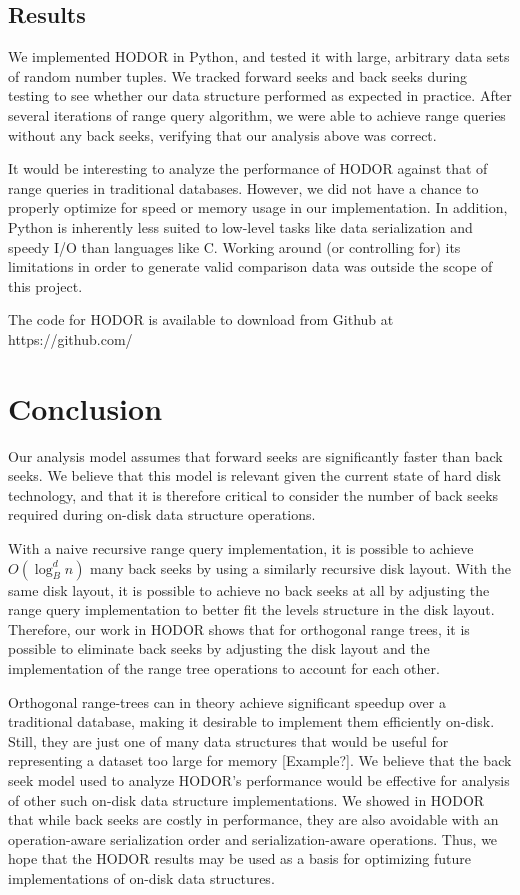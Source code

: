 \documentclass[11pt, oneside]{article}
\begin{document}
\subsection{Results}

We implemented HODOR in Python, and tested it with large, arbitrary data sets of
random number tuples. We tracked forward seeks and back seeks during testing to
see whether our data structure performed as expected in practice. After several 
iterations of range query algorithm, we were able to achieve range queries
without any back seeks, verifying that our analysis above was correct. 

It would be interesting to analyze the performance of HODOR against that of
range queries in traditional databases. However, we did not have a chance to
properly optimize for speed or memory usage in our implementation. In addition,
Python is inherently less suited to low-level tasks like data serialization and
speedy I/O than languages like C. Working around (or controlling for) its
limitations in order to generate valid comparison data was outside the scope of
this project. 

The code for HODOR is available to download from Github at
https://github.com/%

\section{Conclusion}

Our analysis model assumes that forward seeks are significantly faster than
back seeks. We believe that this model is relevant given the current state of
hard disk technology, and that it is therefore critical to consider the number
of back seeks required during on-disk data structure operations. 

With a naive recursive range query implementation, it is possible to achieve
$O(\log_B^d n)$ many back seeks by using a similarly recursive disk layout.
With the same disk layout, it is possible to achieve no back seeks at all by
adjusting the range query implementation to better fit the levels structure in
the disk layout. Therefore, our work in HODOR shows that for orthogonal range
trees, it is possible to eliminate back seeks by adjusting the disk layout and
the implementation of the range tree operations to account for each other. 

Orthogonal range-trees can in theory achieve significant speedup over a
traditional database, making it desirable to implement them efficiently
on-disk. Still, they are just one of many data structures that would be useful
for representing a dataset too large for memory [Example?]. We believe that the
back seek model used to analyze HODOR's performance would be effective for
analysis of other such on-disk data structure implementations. We showed in
HODOR that while back seeks are costly in performance, they are also avoidable
with an operation-aware serialization order and serialization-aware operations.
Thus, we hope that the HODOR results may be used as a basis for optimizing
future implementations of on-disk data structures. 
\end{document}
